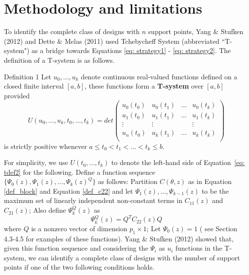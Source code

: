 \documentclass[12pt]{TD-CJS}
\begin{document}
\section{Methodology and limitations} \label{metho}
To identify the complete class of designs with $n$ support points, Yang \& Stufken (2012) and Dette \& Melas (2011) used Tchebycheff System (abbreviated ``T-system") as a bridge towards Equations \eqref{eq: strategy1} - \eqref{eq: strategy2}. The definition of a T-system is as follows.

\begin{theorem}{Definition 1}{}\label{deft}
    Let $u_0, \ldots, u_k$ denote continuous real-valued functions defined on a closed finite interval $[a,b]$, these functions form a \textbf{T-system} over $[a,b]$ provided  
\begin{equation}\label{eq: tdef2}
    U(u_0,\ldots,u_k, t_0,\ldots,t_k) = det\left ( \begin{array}{cccc}
u_0(t_0) &u_0(t_1) &\ldots &u_0(t_k) \\
u_1(t_0) &u_1(t_1) &\ldots &u_1(t_k) \\
\vdots & \vdots &&\vdots\\
u_n(t_0) &u_k(t_1) &\ldots &u_k(t_k) \\
\end{array}\right)
\end{equation}
     is strictly positive whenever $a\le t_0 <t_1< \ldots< t_k\le b$.
\end{theorem}
For simplicity, we use $U(t_0,\ldots,t_k)$ to denote the left-hand side of Equation~\eqref{eq: tdef2} for the following. 
Define a function sequence $\{\Psi_0(z),\Psi_1(z),\ldots, \Psi_k(z)^Q\}$ as follows: Partition $C(\theta,z)$ as in Equation \eqref{def_block} and Equation \eqref{def_c22} and let $\Psi_1(z),\ldots,\Psi_{k-1}(z)$ to be the maximum set of linearly independent non-constant terms in $C_{11}(z)$ and $C_{21}(z)$; Also define $\Psi^Q_{k}(z)$ as \[\Psi_k^Q(z) = Q^TC_{22}(z)Q\] where $Q$ is a nonzero vector of dimension $p_1\times 1$; Let $\Psi_0(z) = 1$ ( {\color{blue} see Section 4.3-4.5 for examples of these functions}). Yang \& Stufken (2012) showed that, given this function sequence  and considering the $\Psi_i$ as $u_i$ functions in the T-system, we can identify a complete class of designs with the number of support points if one of the two following conditions holds. %
\end{document}
